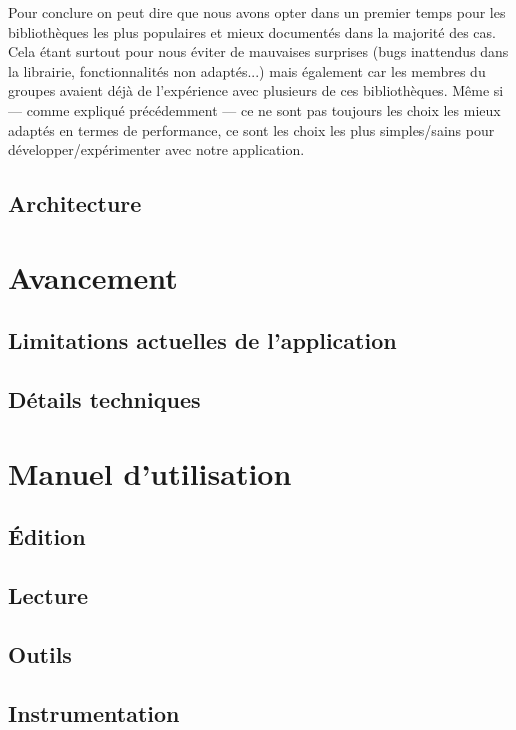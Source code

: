 \documentclass[12pt,a4paper]{article}
\begin{document}
\bigskip
Pour conclure on peut dire que nous avons opter dans un premier temps pour les bibliothèques les plus populaires et mieux documentés dans la majorité des cas. Cela étant surtout pour nous éviter de mauvaises surprises (bugs inattendus dans la librairie, fonctionnalités non adaptés...) mais également car les membres du groupes avaient déjà de l’expérience avec plusieurs de ces bibliothèques. Même si — comme expliqué précédemment — ce ne sont pas toujours les choix les mieux adaptés en termes de performance, ce sont les choix les plus simples/sains pour développer/expérimenter avec notre application.

\subsection{Architecture}


\section{Avancement}

\subsection{Limitations actuelles de l’application}

\subsection{Détails techniques}


\section{Manuel d'utilisation}

\subsection{Édition}

\subsection{Lecture}

\subsection{Outils}

\subsection{Instrumentation}
\end{document}
